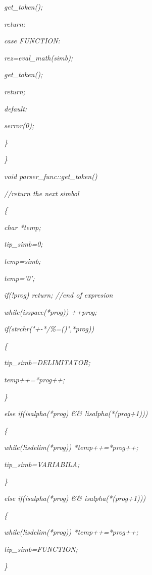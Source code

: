 \documentclass[a4paper,twoside]{book}
\begin{document}
\textit{\qquad \qquad get\_token();}

\textit{\qquad \qquad return;}

\textit{\qquad case FUNCTION:}

\textit{\qquad \qquad *rez=eval\_math(simb);}

\textit{\qquad \qquad get\_token();}

\textit{\qquad \qquad return;}

\textit{\qquad default:}

\textit{\qquad \qquad serror(0);}

\textit{\qquad \}}

\textit{\}}

\textit{void parser\_func::get\_token()}

\textit{//return the next simbol}

\textit{\{}

\textit{\qquad char *temp;}

\textit{\qquad tip\_simb=0;}

\textit{\qquad temp=simb;}

\textit{\qquad *temp='\TEXTsymbol{\backslash}0';}

\textit{\qquad if(!prog) return; //end of expresion}

\textit{\qquad while(isspace(*prog)) ++prog;}

\textit{\qquad if(strchr("+-*/\%=()",*prog))}

\textit{\qquad \{}

\textit{\qquad \qquad tip\_simb=DELIMITATOR;}

\textit{\qquad \qquad *temp++=*prog++;}

\textit{\qquad \}}

\textit{\qquad else if(isalpha(*prog) \&\& !isalpha(*(prog+1)))}

\textit{\qquad \{}

\textit{\qquad \qquad while(!isdelim(*prog)) *temp++=*prog++;}

\textit{\qquad \qquad tip\_simb=VARIABILA;}

\textit{\qquad \}}

\textit{\qquad else if(isalpha(*prog) \&\& isalpha(*(prog+1)))}

\textit{\qquad \{}

\textit{\qquad \qquad while(!isdelim(*prog)) *temp++=*prog++;}

\textit{\qquad \qquad tip\_simb=FUNCTION;}

\textit{\qquad \}}
\end{document}
